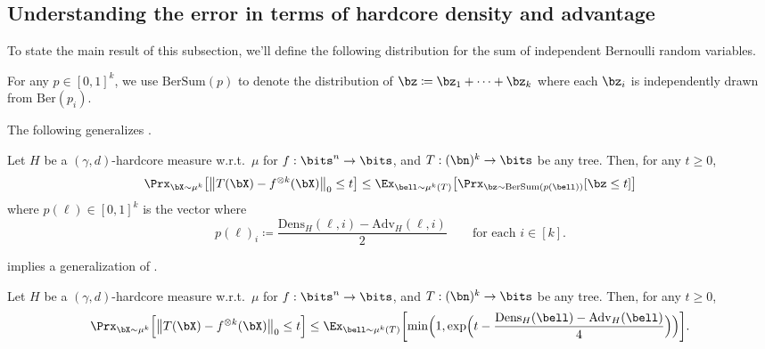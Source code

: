 \documentclass[11pt]{article}
\newcommand{\Ber}{\mathrm{Ber}}
\newcommand{\BerSum}{\mathrm{BerSum}}
\newcommand{\dens}{\mathrm{Dens}}
\newcommand{\adv}{\mathrm{Adv}}
\newcommand{\Dens}{\mathrm{Dens}}
\newcommand{\Adv}{\mathrm{Adv}}
\DeclarePairedDelimiter\lzero{\|}{\|_0}
\DeclarePairedDelimiter\paren{(}{)}
\DeclarePairedDelimiter\bracket{[}{]}
\begin{document}
\subsection{Understanding the error in terms of hardcore density and advantage}
\label{subsec:error-one-leaf}
To state the main result of this subsection, we'll define the following distribution for the sum of independent Bernoulli random variables.
\begin{definition}
    For any $p \in [0,1]^k$, we use $\BerSum(p)$ to denote the distribution of $\bz \coloneqq \bz_1 + \cdots + \bz_k$ where each $\bz_i$ is independently drawn from $\Ber(p_i)$.
\end{definition}
The following generalizes .
\begin{lemma}
    \label{lem:threshold-accuracy-from-stats}
    Let $H$ be a $(\gamma, d)$-hardcore measure w.r.t.~$\mu$ for $f: \bits^n \to \bits$, and $T:(\bn)^k \to \bits$ be any tree. Then, for any $t \geq 0$, 
    \begin{equation*}
        \Prx_{\bX \sim \mu^k}\bracket*{\lzero[\big]{T(\bX)-  f^{\otimes k}(\bX)} \leq t} \leq \Ex_{\bell \sim \mu^k(T)}\bracket*{\Prx_{\bz \sim \BerSum(p(\bell))}[\bz \leq t]}
    \end{equation*}
    where $p(\ell) \in [0,1]^k$ is the vector where
    \begin{equation*}
        p(\ell)_i \coloneqq \frac{\dens_H(\ell,i) - \adv_H(\ell,i)}{2}\quad\quad\text{for each }i \in [k].
    \end{equation*}
\end{lemma}
 implies a generalization of .
\begin{corollary}
    \label{cor:threshold-from-stats-chernoff}
    Let $H$ be a $(\gamma, d)$-hardcore measure w.r.t.~$\mu$ for $f: \bits^n \to \bits$, and $T:(\bn)^k \to \bits$ be any tree. Then, for any $t \geq 0$,
    \begin{equation*}
        \Prx_{\bX \sim \mu^k}\bracket[\Big]{\lzero[\big]{T(\bX)- f^{\otimes k}(\bX)} \leq t} \leq \Ex_{\bell \sim \mu^k(T)}\bracket*{\min\paren[\Big]{1, \exp\paren[\Big]{t - \frac{\Dens_H(\bell) - \Adv_H(\bell)}{4}}}}.
    \end{equation*}
\end{corollary}
\end{document}
